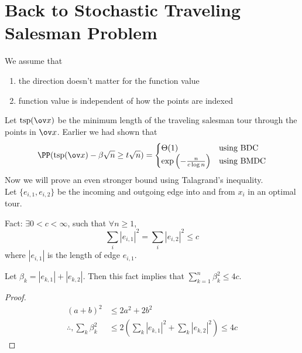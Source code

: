 \section{Back to Stochastic Traveling Salesman Problem}
We assume that 
\begin{enumerate}
    \item[\circled{1}] the direction doesn't matter for the function value 
    \item[\circled{2}] function value is independent of how the points are indexed
\end{enumerate}
\newcommand{\tsp}{\text{tsp}}
Let $\tsp(\ov x)$ be the minimum length of the traveling salesman tour through the points in $\ov x$. Earlier we had shown that
\[
\PP(\tsp(\ov x) - \beta \sqrt n \geq t\sqrt n) =
\begin{cases}
    \Theta (1) & \text{using BDC} \\
    \exp\left(-\frac{n}{c\log n}\right) &\text{using BMDC}
\end{cases}
\]
Now we will prove an even stronger bound using Talagrand's inequality. \\
Let $\{e_{i,1}, e_{i,2}\}$ be the incoming and outgoing edge into and from $x_i$ in an optimal tour.
\begin{figure}[h]
    \centering
\end{figure}
\begin{note}
Fact: $\exists 0 < c < \infty$, such that $\forall n \geq 1$,
\begin{equation}
    \sum_i |e_{i,1}|^2 = \sum_i |e_{i,2}|^2 \leq c
\end{equation}
where $|e_{i,1}|$ is the length of edge $e_{i,1}$.
\end{note}
\begin{prop}
    Let $\beta_k = |e_{k,1}| + |e_{k,2}|$. Then this fact implies that $\sum_{k=1}^n \beta_k^2 \leq 4c$.
\end{prop}
\begin{proof}
\begin{align*}
    (a+b)^2 &\leq 2a^2 + 2b^2 \\
    \therefore, \sum_{k}\beta_k^2 &\leq 2\left(\sum_{k}|e_{k,1}|^2 + \sum_k |e_{k,2}|^2\right) \leq 4c
\end{align*}
\end{proof}
